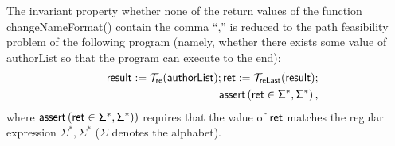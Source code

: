 The invariant property whether none of the return values of the function {\sf changeNameFormat()} contain the comma ``,'' is reduced to the path feasibility problem of the following program (namely, whether there exists some value of {\sf authorList} so that the program can execute to the end):  
%
\begin{eqnarray}\label{eqn:exmp}
& & \sf result  := \sf  \mathcal{T}_{ re}(authorList); ret : = \mathcal{T}_{reLast}(result);\nonumber \\
& &  \textsf{assert}\left(\sf ret \in \Sigma^*,\Sigma^*\right),
\end{eqnarray}
%
where $\textsf{assert}\left(\sf ret \in \Sigma^*,\Sigma^*)\right)$ requires that the value of $\sf ret$ matches the regular expression $\Sigma^*, \Sigma^*$ ($\Sigma$ denotes the alphabet).

